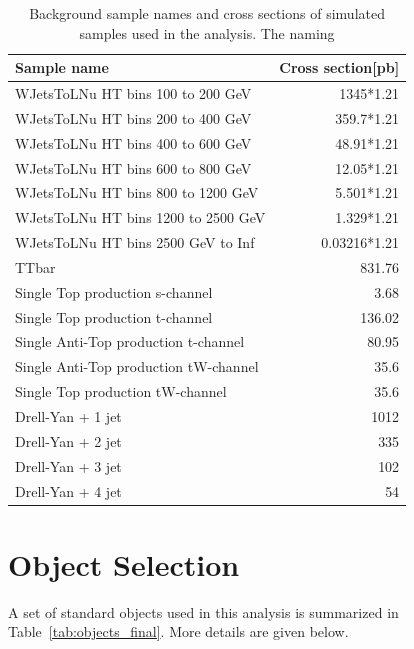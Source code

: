 %
\begin{table}[!htbp]
\footnotesize
\centering
 {\scriptsize
\begin{tabular}{lr}
\textbf{Sample name} & \textbf{Cross section[pb]} \\
\hline
WJetsToLNu HT bins 100 to 200 GeV & 1345*1.21 \\
WJetsToLNu HT bins 200 to 400 GeV  & 359.7*1.21 \\
WJetsToLNu HT bins 400 to 600 GeV & 48.91*1.21 \\
WJetsToLNu HT bins 600 to 800 GeV & 12.05*1.21 \\
WJetsToLNu HT bins 800 to 1200 GeV & 5.501*1.21 \\
WJetsToLNu HT bins 1200 to 2500 GeV & 1.329*1.21 \\
WJetsToLNu HT bins 2500 GeV to Inf  & 0.03216*1.21 \\
\hline
TTbar & 831.76 \\
\hline
Single Top production s-channel & 3.68 \\
Single Top production t-channel & 136.02 \\
Single Anti-Top production t-channel & 80.95 \\
Single Anti-Top production tW-channel & 35.6 \\
Single Top production tW-channel & 35.6 \\
\hline
Drell-Yan + 1 jet  & 1012 \\
 Drell-Yan + 2 jet & 335 \\
 Drell-Yan + 3 jet & 102 \\
 Drell-Yan + 4 jet & 54 \\
 \hline
\end{tabular}
}
\caption{Background sample names and cross sections of simulated samples used in the analysis. The naming }
\label{tab:bkgSamples}
\end{table}




\section{Object Selection} %
\label{sec:object_selection}
A set of standard objects used in this analysis is summarized in Table~\ref{tab:objects_final}. More details are given below.  

